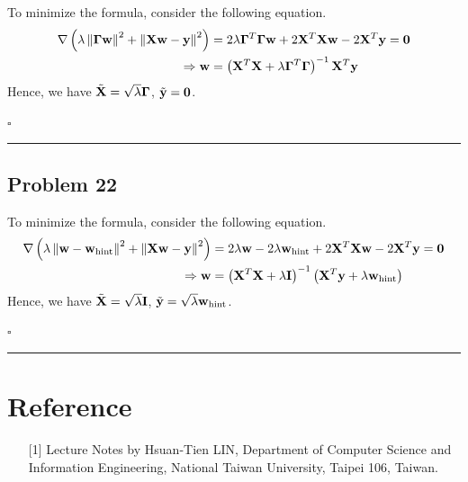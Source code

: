 \documentclass[12pt]{article}
\newcommand*{\QEDB}{\hfill\ensuremath{\square}}
\newcommand{\ParTh}[1]{\left(#1\right)}
\newcommand{\BF}[1]{{\bf#1}}
\newcommand{\VecAbsVal}[1]{\left\|#1\right\|}
\newcommand{\horrule}[1]{\rule{\linewidth}{#1}}
\begin{document}
To minimize the formula, consider the following equation.
\begin{align}
\nabla\ParTh{\lambda\VecAbsVal{\BF{\Gamma}\BF{w}}^2+\VecAbsVal{\BF{X}\BF{w}-\BF{y}}^2}&=2\lambda\BF{\Gamma}^T\BF{\Gamma}\BF{w}+2\BF{X}^T\BF{X}\BF{w}-2\BF{X}^T\BF{y}=\BF{0}\\
\Rightarrow\BF{w}&=\ParTh{\BF{X}^T\BF{X}+\lambda\BF{\Gamma}^T\BF{\Gamma}}^{-1}\BF{X}^T\BF{y}
\end{align}
Hence, we have $\tilde{\BF{X}}=\sqrt{\lambda}\BF{\Gamma}$, $\tilde{\BF{y}}=\BF{0}$.

\QEDB

\horrule{0.5pt}

\subsection*{Problem 22}

To minimize the formula, consider the following equation.
\begin{align}
\nabla\ParTh{\lambda\VecAbsVal{\BF{w}-\BF{w}_{\text{hint}}}^2+\VecAbsVal{\BF{X}\BF{w}-\BF{y}}^2}&=2\lambda\BF{w}-2\lambda\BF{w}_{\text{hint}}+2\BF{X}^T\BF{X}\BF{w}-2\BF{X}^T\BF{y}=\BF{0}\\
\Rightarrow\BF{w}&=\ParTh{\BF{X}^T\BF{X}+\lambda\BF{I}}^{-1}\ParTh{\BF{X}^T\BF{y}+\lambda\BF{w}_{\text{hint}}}
\end{align}
Hence, we have $\tilde{\BF{X}}=\sqrt{\lambda}\BF{I}$, $\tilde{\BF{y}}=\sqrt{\lambda}\BF{w}_{\text{hint}}$.

\QEDB

\horrule{0.5pt}

\section*{Reference}

\begin{enumerate}

\item[{[1]}] Lecture Notes by Hsuan-Tien LIN, Department of Computer Science and Information Engineering, National Taiwan University, Taipei 106, Taiwan.


\end{enumerate}
\end{document}
